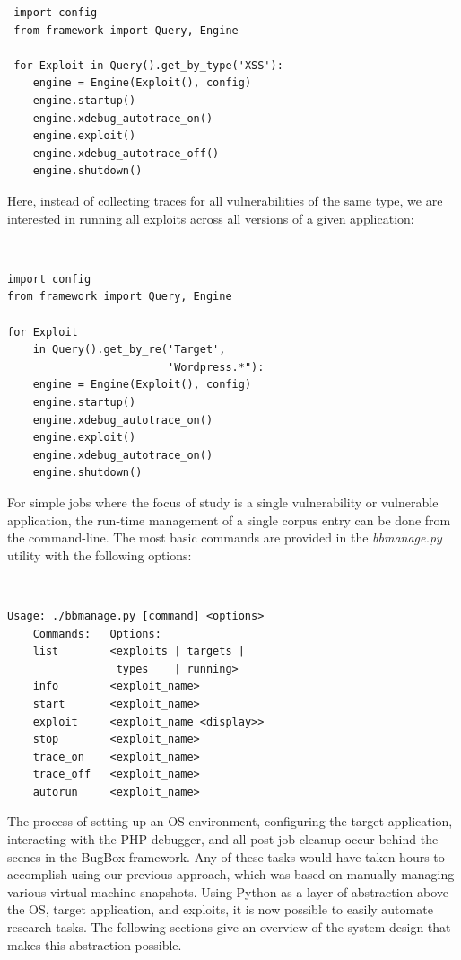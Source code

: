 \documentclass[letterpaper,twocolumn,10pt]{article}
\begin{document}
\begin{minipage}{\textwidth}
{\tt \footnotesize

\begin{lstlisting}
 import config
 from framework import Query, Engine
 
 for Exploit in Query().get_by_type('XSS'):
    engine = Engine(Exploit(), config)
    engine.startup()
    engine.xdebug_autotrace_on()
    engine.exploit()
    engine.xdebug_autotrace_off()
    engine.shutdown()
\end{lstlisting}
}
\end{minipage}


Here, instead of collecting traces for all vulnerabilities of the same type, we are interested in running all exploits across all versions of a given application:

\begin{minipage}{\textwidth}
{\tt \footnotesize
\begin{lstlisting}
import config
from framework import Query, Engine

for Exploit 
    in Query().get_by_re('Target', 
                         'Wordpress.*"):
    engine = Engine(Exploit(), config)
    engine.startup()
    engine.xdebug_autotrace_on()
    engine.exploit()
    engine.xdebug_autotrace_on()
    engine.shutdown()
\end{lstlisting}
}
\end{minipage}

For simple jobs where the focus of study is a single vulnerability or vulnerable application, the run-time management of a single corpus entry can be done from the command-line. The most basic commands are provided in the \emph{bbmanage.py} utility with the following options:

{\tt \footnotesize
\begin{verbatim}
Usage: ./bbmanage.py [command] <options>
    Commands:   Options:
    list        <exploits | targets | 
                 types    | running>
    info        <exploit_name>
    start       <exploit_name>
    exploit     <exploit_name <display>>
    stop        <exploit_name>
    trace_on    <exploit_name>
    trace_off   <exploit_name>
    autorun     <exploit_name>
\end{verbatim}
}

The process of setting up an OS environment, configuring the target application, interacting with the PHP debugger, and all post-job cleanup occur behind the scenes in the BugBox framework. Any of these tasks would have taken hours to accomplish using our previous approach, which was based on manually managing various virtual machine snapshots. Using Python as a layer of abstraction above the OS, target application, and exploits, it is now possible to easily automate research tasks. The following sections give an overview of the system design that makes this abstraction possible.
\end{document}
